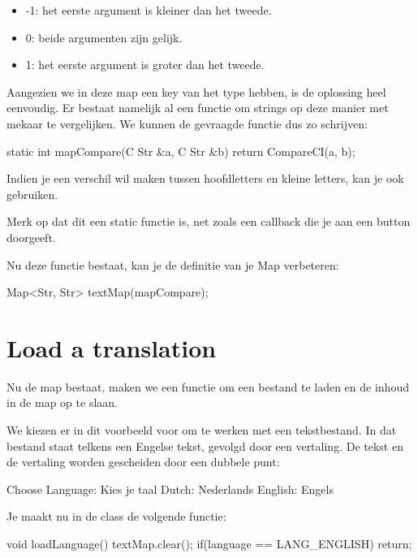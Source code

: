 \begin{itemize}
	\item -1: het eerste argument is kleiner dan het tweede.
	\item  0: beide argumenten zijn gelijk.
	\item  1: het eerste argument is groter dan het tweede.
\end{itemize}

Aangezien we in deze map een key van het type  hebben, is de oplossing heel eenvoudig. Er bestaat namelijk al een functie om strings op deze manier met mekaar te vergelijken. We kunnen de gevraagde functie dus zo schrijven: 

\begin{code}
static int mapCompare(C Str &a, C Str &b)
{
  return CompareCI(a, b);
}
\end{code}

Indien je een verschil wil maken tussen hoofdletters en kleine letters, kan je ook  gebruiken.

\begin{note}
Merk op dat dit een static functie is, net zoals een callback die je aan een button doorgeeft.
\end{note}

Nu deze functie bestaat, kan je de definitie van je Map verbeteren:

\begin{code}
Map<Str, Str> textMap(mapCompare);
\end{code}

\section{Load a translation}
Nu de map bestaat, maken we een functie om een bestand te laden en de inhoud in de map op te slaan.

We kiezen er in dit voorbeeld voor om te werken met een tekstbestand. In dat bestand staat telkens een Engelse tekst, gevolgd door een vertaling. De tekst en de vertaling worden gescheiden door een dubbele punt:

\begin{code}
Choose Language: Kies je taal
Dutch: Nederlands
English: Engels
\end{code}

Je maakt nu in de class  de volgende functie:

\begin{code}
void loadLanguage() {
	textMap.clear();
	if(language == LANG_ENGLISH) return;
}
\end{code}


